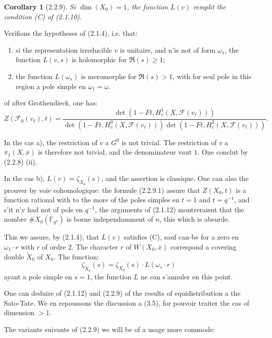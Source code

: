 \documentclass[12pt,a4paper]{article}
\theoremstyle{plain}
\newtheorem{corollary}[theorem]{Corollary}
\theoremstyle{definition}
\theoremstyle{remark}
\newcommand{\FF}{{\mathbb{F}}}
\begin{document}
\begin{corollary}[2.2.9]
Si $\dim(X_0) = 1$, the function $L(v)$ remplit the condition (C) of (2.1.10).
\end{corollary}

Verifions the hypotheses of (2.1.4), i.e. that:
\begin{enumerate}[label=\alph*)]
\item si the representation irreducible $v$ is unitaire, and n'is not of form $\omega_s$, the function $L(v,s)$ is holomorphic for $\Re(s) \geq 1$;
\item the function $L(\omega_s)$ is meromorphe for $\Re(s) > 1$, with for seul pole in this region a pole simple en $\omega_1 = \omega$.
\end{enumerate}

of after Grothendieck, one has:
\begin{equation}\label{eq:2.2.9.1}
Z(\mathscr{F}_0(v_\ell), t) = \frac{\det(1 - Ft, H_c^1(X, \mathscr{F}(v_\ell)))}{\det(1 - Ft, H_c^0(X, \mathscr{F}(v_\ell))) \det(1 - Ft, H_c^2(X, \mathscr{F}(v_\ell)))}.
\end{equation}

In the cas a), the restriction of $v$ a $G^0$ is not trivial. The restriction of $v$ a $\pi_1(X, \overline{x})$ is therefore not trivial, and the denominateur vaut $1$. One conclut by (2.2.8) (ii).

In the cas b), $L(v) = \zeta_{X_0}(s)$, and the assertion is classique. One can also the prouver by voie cohomologique: the formule (2.2.9.1) assure that $Z(X_0, t)$ is a function rational with to the more of the poles simples en $t = 1$ and $t = q^{-1}$, and s'it n'y had not of pole en $q^{-1}$, the arguments of (2.1.12) montreraient that the nombre $\#X_0(\FF_{q^n})$ is borne independamment of $n$, this which is absurde.

This we assure, by (2.1.4), that $L(v)$ satisfies (C), sauf can-be for a zero en $\omega_1 \cdot r$ with $r$ of ordre $2$. The character $r$ of $W(X_0, \overline{x})$ correspond a covering double $\widetilde{X}_0$ of $X_0$. The function:
\[ \zeta_{\widetilde{X}_0}(s) = \zeta_{X_0}(s) \cdot L(\omega_s \cdot r) \]
ayant a pole simple en $s = 1$, the function $L$ ne can s'annuler en this point.

One can deduire of (2.1.12) and (2.2.9) of the results of equidistribution a the Sato-Tate. We en repoussons the discussion a (3.5), for pouvoir traiter the cas of dimension $> 1$.

The variante suivante of (2.2.9) we will be of a usage more commode:
\end{document}
